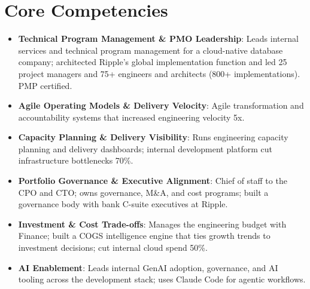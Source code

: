 \documentclass[11pt,letterpaper,sans]{moderncv}
\begin{document}
\section{Core Competencies}
\vspace{1pt}
\begin{itemize}

\item \textbf{Technical Program Management \& PMO Leadership}: Leads internal services and technical program management for a cloud-native database company; architected Ripple's global implementation function and led 25 project managers and 75+ engineers and architects (800+ implementations). PMP certified.

\item \textbf{Agile Operating Models \& Delivery Velocity}: Agile transformation and accountability systems that increased engineering velocity 5x.

\item \textbf{Capacity Planning \& Delivery Visibility}: Runs engineering capacity planning and delivery dashboards; internal development platform cut infrastructure bottlenecks 70\%.

\item \textbf{Portfolio Governance \& Executive Alignment}: Chief of staff to the CPO and CTO; owns governance, M\&A, and cost programs; built a governance body with bank C-suite executives at Ripple.

\item \textbf{Investment \& Cost Trade-offs}: Manages the engineering budget with Finance; built a COGS intelligence engine that ties growth trends to investment decisions; cut internal cloud spend 50\%.

\item \textbf{AI Enablement}: Leads internal GenAI adoption, governance, and AI tooling across the development stack; uses Claude Code for agentic workflows.

\end{itemize}

\end{document}
